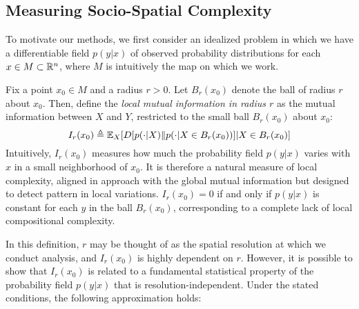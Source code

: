 \subsection{Measuring Socio-Spatial Complexity}
		To motivate our methods, we first consider an idealized problem in which we have a differentiable field $p(y|x)$ of observed probability distributions for each $x \in M \subset \mathbb{R}^n$, where $M$ is intuitively the map on which we work. 

		Fix a point $x_0 \in M$ and a radius $r > 0$. Let $B_r(x_0)$ denote the ball of radius $r$ about $x_0$. Then, define the \emph{local mutual information in radius $r$} as the mutual information between $X$ and $Y$, restricted to the small ball $B_r(x_0)$ about $x_0$:
		\begin{equation}
			I_r(x_0) \triangleq \mathbb{E}_X[D[p(\cdot|X)\| p(\cdot|X \in B_r(x_0))]|X \in B_r(x_0)]
		\end{equation}
		Intuitively, $I_r(x_0)$ measures how much the probability field $p(y|x)$ varies with $x$ in a small neighborhood of $x_0$. It is therefore a natural measure of local complexity, aligned in approach with the global mutual information but designed to detect pattern in local variations. $I_r(x_0) = 0$ if and only if $p(y|x)$ is constant for each $y$ in the ball $B_r(x_0)$, corresponding to a complete lack of local compositional complexity. 


		In this definition, $r$ may be thought of as the spatial resolution at which we conduct analysis, and $I_r(x_0)$ is highly dependent on $r$. However, it is possible to show that $I_r(x_0)$ is related to a fundamental statistical property of the probability field $p(y|x)$ that is resolution-independent. Under the stated conditions, the following approximation holds: 

